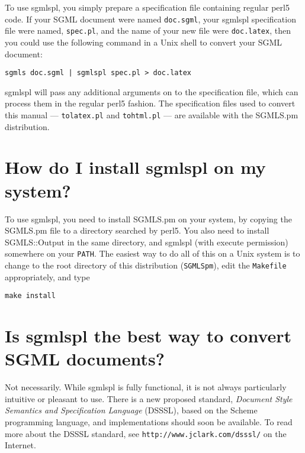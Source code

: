 To use {\sc sgmlspl}, you simply prepare a specification file
containing regular {\sc perl5} code.  If your {\sc SGML} document were named
{\tt doc.sgml}, your {\sc sgmlspl} specification file
were named, {\tt spec.pl}, and the name of your new
file were {\tt doc.latex}, then you could use the
following command in a Unix shell to convert your {\sc SGML} document:

{\footnotesize\begin{verbatim}
sgmls doc.sgml | sgmlspl spec.pl > doc.latex
\end{verbatim}}

{\sc sgmlspl} will pass any additional arguments on to the specification
file, which can process them in the regular {\sc perl5} fashion.  The
specification files used to convert this manual {---}
{\tt tolatex.pl} and {\tt tohtml.pl}
{---} are available with the {\sc SGMLS.pm} distribution.




\section{How do I install {\sc sgmlspl} on my system?}
\label{INSTALLATION}


To use {\sc sgmlspl}, you need to install {\sc SGMLS.pm} on your system,
by copying the {\sc SGMLS.pm} file to a directory searched by {\sc perl5}.
You also need to install {\sc SGMLS::Output} in the same directory, and
{\sc sgmlspl} (with execute permission) somewhere on your
{\tt PATH}.  The easiest way to do all of this on a Unix
system is to change to the root directory of this distribution
({\tt SGMLSpm}), edit the {\tt Makefile}
appropriately, and type

{\footnotesize\begin{verbatim}
make install
\end{verbatim}}




\section{Is {\sc sgmlspl} the best way to convert {\sc SGML} documents?}
\label{DSSSL}


Not necessarily.  While {\sc sgmlspl} is fully functional, it is not
always particularly intuitive or pleasant to use.  There is a new
proposed standard, {\em Document Style Semantics and
Specification Language\/} ({\sc DSSSL}), based
on the {\sc Scheme} programming language, and
implementations should soon be available.  To read more about the
{\sc DSSSL} standard, see {\tt http://www.jclark.com/dsssl/}
on the Internet.

